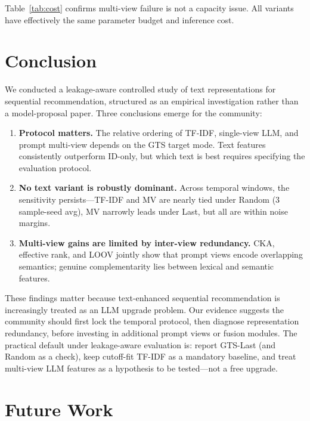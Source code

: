 \documentclass[sigconf,natbib=true,anonymous]{acmart}
\newcommand{\tfidf}{\textsc{TF-IDF}\xspace}
\newcommand{\llm}{\textsc{LLM}\xspace}
\begin{document}
Table~\ref{tab:cost} confirms multi-view failure is not a capacity issue.  All variants have effectively the same parameter budget and inference cost.

\section{Conclusion}
\label{sec:conclusion}

We conducted a leakage-aware controlled study of text representations for sequential recommendation, structured as an empirical investigation rather than a model-proposal paper.
Three conclusions emerge for the community:

\begin{enumerate}[leftmargin=*,itemsep=1pt]
\item \textbf{Protocol matters.}
The relative ordering of \tfidf, single-view \llm, and prompt multi-view depends on the GTS target mode.
Text features consistently outperform ID-only, but which text is best requires specifying the evaluation protocol.
\item \textbf{No text variant is robustly dominant.}
Across temporal windows, the sensitivity persists---\tfidf and MV are nearly tied under Random (3 sample-seed avg), MV narrowly leads under Last, but all are within noise margins.
\item \textbf{Multi-view gains are limited by inter-view redundancy.}
CKA, effective rank, and LOOV jointly show that prompt views encode overlapping semantics; genuine complementarity lies between lexical and semantic features.
\end{enumerate}

These findings matter because text-enhanced sequential recommendation is increasingly treated as an LLM upgrade problem.
Our evidence suggests the community should first lock the temporal protocol, then diagnose representation redundancy, before investing in additional prompt views or fusion modules.
The practical default under leakage-aware evaluation is: report GTS-Last (and Random as a check), keep cutoff-fit \tfidf as a mandatory baseline, and treat multi-view LLM features as a hypothesis to be tested---not a free upgrade.

\section{Future Work}
\label{sec:future}
\end{document}
